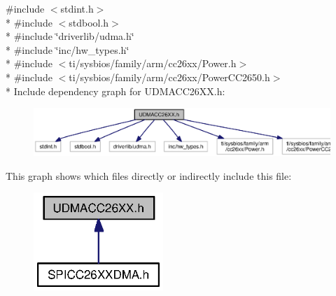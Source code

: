 {\ttfamily \#include $<$stdint.\+h$>$}\\*
{\ttfamily \#include $<$stdbool.\+h$>$}\\*
{\ttfamily \#include \char`\"{}driverlib/udma.\+h\char`\"{}}\\*
{\ttfamily \#include \char`\"{}inc/hw\+\_\+types.\+h\char`\"{}}\\*
{\ttfamily \#include $<$ti/sysbios/family/arm/cc26xx/\+Power.\+h$>$}\\*
{\ttfamily \#include $<$ti/sysbios/family/arm/cc26xx/\+Power\+C\+C2650.\+h$>$}\\*
Include dependency graph for U\+D\+M\+A\+C\+C26\+X\+X.\+h\+:
\nopagebreak
\begin{figure}[H]
\begin{center}
\leavevmode
\includegraphics[width=350pt]{_u_d_m_a_c_c26_x_x_8h__incl}
\end{center}
\end{figure}
This graph shows which files directly or indirectly include this file\+:
\nopagebreak
\begin{figure}[H]
\begin{center}
\leavevmode
\includegraphics[width=139pt]{_u_d_m_a_c_c26_x_x_8h__dep__incl}
\end{center}
\end{figure}
